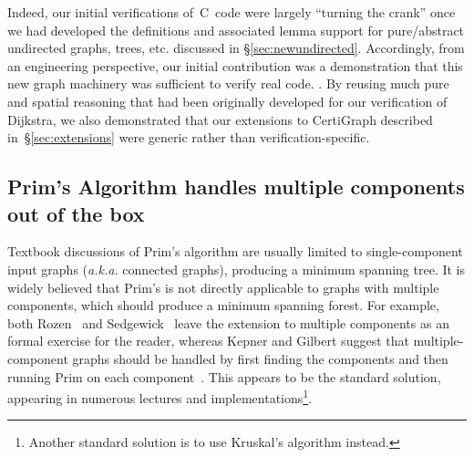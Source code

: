 Indeed, our initial verifications of~C~code were largely ``turning the crank'' once we had developed the definitions and associated lemma support for pure/abstract undirected graphs, trees, etc. discussed in \S\ref{sec:newundirected}.  Accordingly, from an engineering perspective, our initial contribution was a demonstration that this new graph machinery was sufficient to verify real code.  .  By reusing much pure and spatial reasoning that had been originally developed for our verification of Dijkstra, we also demonstrated that our extensions to CertiGraph described in~\S\ref{sec:extensions} were generic rather than verification-specific.

\subsection{Prim's Algorithm handles multiple components out of the box}
\label{sec:primforest}

Textbook discussions of Prim's algorithm are usually limited to single-component input graphs (\emph{a.k.a.} connected graphs), producing a minimum spanning tree.  It is widely believed that Prim's is not directly applicable to graphs with multiple components, which should produce a minimum spanning forest.  For example, both Rozen~\cite{rozen} and Sedgewick~\cite{sedgewick} leave the extension to multiple components as an formal exercise for the reader, whereas Kepner and Gilbert suggest that multiple-component graphs should be handled by first finding the components and then running Prim on each component~\cite{kepnergilbert}.  This appears to be the standard solution, appearing in numerous lectures and implementations\footnote{Another standard solution is to use Kruskal's  algorithm instead.}. %

